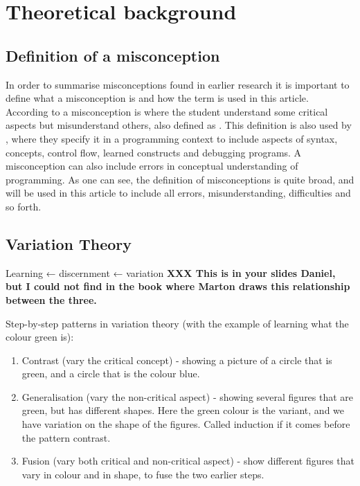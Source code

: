 \mode*
\section{Theoretical background}

\subsection{Definition of a misconception}

In order to summarise misconceptions found in earlier research it is 
important to define what a misconception is and how the term is used in this 
article. According to \textcite{NCOL} a misconception is where the student 
understand some critical aspects but misunderstand others, also defined as 
. This definition is also used by 
\textcite{MisconceptionsSurvey2017}, where they specify it in a programming 
context to include aspects of syntax, concepts, control flow, learned 
constructs and debugging programs. A misconception can also include errors 
in 
conceptual understanding of programming. As one can see, the definition of 
misconceptions is quite broad, and will be used in this article to include 
all 
errors, misunderstanding, difficulties and so forth. 

\subsection{Variation Theory}

Learning ← discernment ← variation \textbf{XXX This is in your slides 
Daniel, but I could not find in the book where Marton draws this 
relationship between the three.}

Step-by-step patterns in variation theory (with the example of learning 
what the colour green is):

\begin{enumerate}
    \item Contrast (vary the critical concept) - showing a picture of a 
circle that is green, and a circle that is the colour blue.
    \item Generalisation (vary the non-critical aspect) - showing several 
figures that are green, but has different shapes. Here the green colour 
is the variant, and we have variation on the shape of the figures. 
Called induction if it comes before the pattern contrast.
    \item Fusion (vary both critical and non-critical aspect) - show 
different figures that vary in colour and in shape, to fuse the two 
earlier steps.
\end{enumerate}

